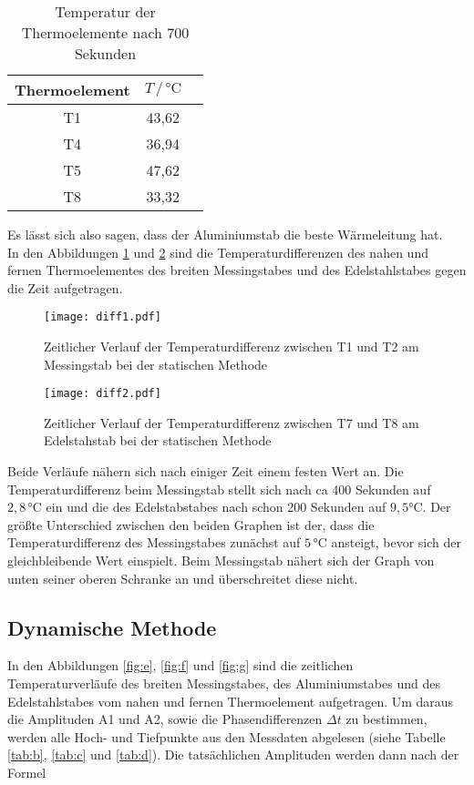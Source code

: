 \begin{table}[H]
\centering
\caption{Temperatur der Thermoelemente nach 700 Sekunden}
\label{tab:a}
\begin{tabular}{S[table-format=3.0] S S[table-format=3.2]}
\toprule
{Thermoelement} & {$T\,/\,\si{\celsius}$}\\
\midrule
T1 & 43,62\\
T4 & 36,94\\
T5 & 47,62\\
T8 & 33,32\\

\bottomrule
\end{tabular}
\end{table}

\noindent Es lässt sich also sagen, dass der Aluminiumstab die beste Wärmeleitung hat.\\


\noindent In den Abbildungen \ref{fig:c} und \ref{fig:d} sind die Temperaturdifferenzen des nahen und fernen Thermoelementes des breiten
Messingstabes und des Edelstahlstabes gegen die Zeit aufgetragen.
\begin{figure}[H]
  \centering
  \texttt{[image: diff1.pdf]}
  \caption{Zeitlicher Verlauf der Temperaturdifferenz zwischen T1 und T2 am Messingstab bei der statischen Methode}
  \label{fig:c}
\end{figure}

\begin{figure}[H]
  \centering
  \texttt{[image: diff2.pdf]}
  \caption{Zeitlicher Verlauf der Temperaturdifferenz zwischen T7 und T8 am Edelstahstab bei der statischen Methode}
  \label{fig:d}
\end{figure}

\noindent Beide Verläufe nähern sich nach einiger Zeit einem festen Wert an. Die Temperaturdifferenz beim Messingstab
stellt sich nach ca 400 Sekunden auf  $2,8\,\si{\celsius}$ ein und die des Edelstabstabes nach schon 200 Sekunden auf $9,5\si{\celsius}$.
Der größte Unterschied zwischen den beiden Graphen ist der, dass die Temperaturdifferenz des Messingstabes zunächst auf $5\,\si{\celsius}$ ansteigt, bevor sich der
gleichbleibende Wert einspielt. Beim Messingstab nähert sich der Graph von unten seiner oberen Schranke an und überschreitet diese nicht.


\subsection{Dynamische Methode}
In den Abbildungen \ref{fig:e}, \ref{fig:f} und \ref{fig:g} sind die zeitlichen Temperaturverläufe des breiten Messingstabes, des Aluminiumstabes und des Edelstahlstabes vom nahen und fernen Thermoelement aufgetragen.
Um daraus die Amplituden A1 und A2, sowie die Phasendifferenzen $\Delta t$ zu bestimmen, werden alle Hoch- und Tiefpunkte aus den Messdaten abgelesen (siehe Tabelle \ref{tab:b}, \ref{tab:c} und \ref{tab:d}).
Die tatsächlichen Amplituden werden dann nach der Formel

